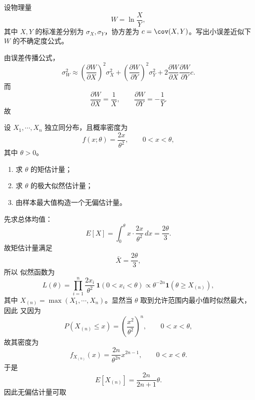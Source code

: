 ﻿

\begin{question}
设物理量
\[
W=\ln\frac{X}{Y},
\]
其中 $X,Y$ 的标准差分别为 $\sigma_X,\sigma_Y$，协方差为 $c=\cov(X,Y)$。写出小误差近似下 $W$ 的不确定度公式。
\begin{solution}
由误差传播公式，
\[
\sigma_W^2\approx
\left(\frac{\partial W}{\partial X}\right)^2\sigma_X^2+
\left(\frac{\partial W}{\partial Y}\right)^2\sigma_Y^2+
2\frac{\partial W}{\partial X}\frac{\partial W}{\partial Y}c.
\]
而
\[
\frac{\partial W}{\partial X}=\frac1X,
\qquad
\frac{\partial W}{\partial Y}=-\frac1Y.
\]
故
\end{solution}
\end{question}

\begin{question}
设 $X_1,\cdots,X_n$ 独立同分布，且概率密度为
\[
f(x;\theta)=\frac{2x}{\theta^2},\qquad 0<x<\theta,
\]
其中 $\theta>0$。
\begin{enumerate}
\item 求 $\theta$ 的矩估计量；
\item 求 $\theta$ 的极大似然估计量；
\item 由样本最大值构造一个无偏估计量。
\end{enumerate}
\begin{solution}
先求总体均值：
\[
E[X]=\int_0^{\theta} x\cdot \frac{2x}{\theta^2}\,dx
=\frac{2\theta}{3}.
\]
故矩估计量满足
\[
\bar X=\frac{2\theta}{3},
\]
所以
似然函数为
\[
L(\theta)=\prod_{i=1}^n \frac{2x_i}{\theta^2}\,\mathbf 1(0<x_i<\theta)
\propto \theta^{-2n}\mathbf 1(\theta\ge X_{(n)}),
\]
其中 $X_{(n)}=\max(X_1,\cdots,X_n)$。显然当 $\theta$ 取到允许范围内最小值时似然最大，因此
又因为
\[
P(X_{(n)}\le x)=\left(\frac{x^2}{\theta^2}\right)^n,
\qquad 0<x<\theta,
\]
故其密度为
\[
f_{X_{(n)}}(x)=\frac{2n}{\theta^{2n}}x^{2n-1},
\qquad 0<x<\theta.
\]
于是
\[
E[X_{(n)}]=\frac{2n}{2n+1}\theta.
\]
因此无偏估计量可取
\end{solution}
\end{question}

